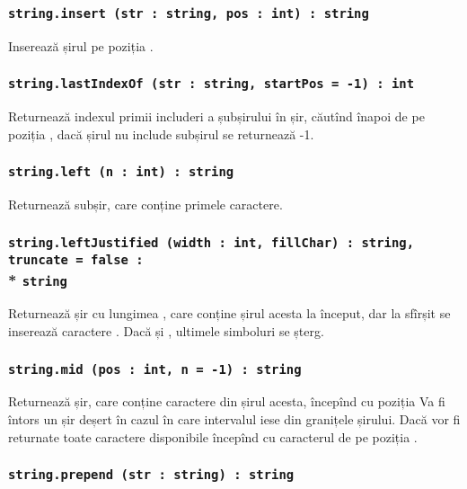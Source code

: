 \subsubsection{\lstinline|string.insert (str : string, pos : int) : string|}

Inserează șirul  pe poziția .

\subsubsection{\lstinline|string.lastIndexOf (str : string, startPos = -1) : int|}

Returnează indexul primii includeri a șubșirului  în șir, căutînd înapoi de pe poziția , dacă șirul nu include subșirul se returnează -1.

\subsubsection{\lstinline|string.left (n : int) : string|}

Returnează subșir, care conține primele  caractere.

\subsubsection{\lstinline|string.leftJustified (width : int, fillChar) : string, truncate = false :|\\* \lstinline|string|}

Returnează șir cu lungimea , care conține șirul acesta la început, dar la sfîrșit se inserează  caractere . Dacă  și , ultimele  simboluri se șterg.

\subsubsection{\lstinline|string.mid (pos : int, n = -1) : string|}

Returnează șir, care conține  caractere din șirul acesta, începînd cu poziția  Va fi întors un șir deșert în cazul în care intervalul iese din granițele șirului. Dacă  vor fi returnate toate caractere disponibile începînd cu caracterul de pe poziția .

\subsubsection{\lstinline|string.prepend (str : string) : string|}

